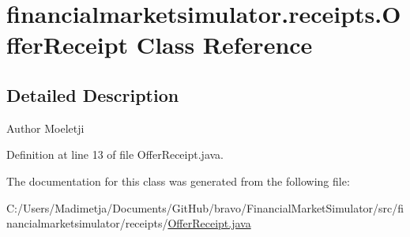 \hypertarget{classfinancialmarketsimulator_1_1receipts_1_1_offer_receipt}{\section{financialmarketsimulator.\+receipts.\+Offer\+Receipt Class Reference}
\label{classfinancialmarketsimulator_1_1receipts_1_1_offer_receipt}
}


\subsection{Detailed Description}
\begin{DoxyAuthor}{Author}
Moeletji 
\end{DoxyAuthor}


Definition at line 13 of file Offer\+Receipt.\+java.



The documentation for this class was generated from the following file\+:\begin{DoxyCompactItemize}
\item 
C\+:/\+Users/\+Madimetja/\+Documents/\+Git\+Hub/bravo/\+Financial\+Market\+Simulator/src/financialmarketsimulator/receipts/\hyperlink{_offer_receipt_8java}{Offer\+Receipt.\+java}\end{DoxyCompactItemize}
